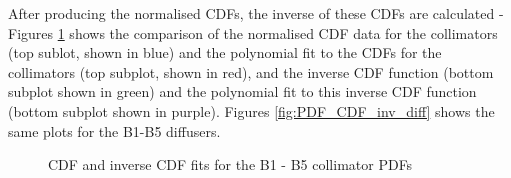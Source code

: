 After producing the normalised CDFs, the inverse of these CDFs are calculated - Figures \ref{fig:PDF_CDF_inv_coll} shows the comparison of the normalised CDF data for the collimators (top sublot, shown in blue) and the polynomial fit to the CDFs for the collimators (top subplot, shown in red), and the inverse CDF function (bottom subplot shown in green) and the polynomial fit to this inverse CDF function (bottom subplot shown in purple). Figures \ref{fig:PDF_CDF_inv_diff} shows the same plots for the B1-B5 diffusers. 

\begin{figure}[!htbp]
\centering
    
\caption{CDF and inverse CDF fits for the B1 - B5 collimator PDFs} \label{fig:PDF_CDF_inv_coll} 
    
     \hfill
     \par
     \hfill

\end{figure}

